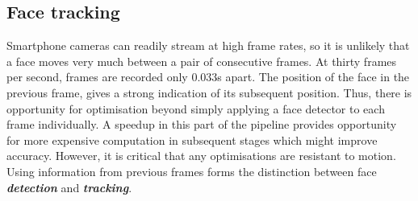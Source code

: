\subsection{Face tracking}
\label{section:face_tracking_impl}
Smartphone cameras can readily stream at high frame rates, so it is unlikely that a face moves very much between a pair of consecutive frames. At thirty frames per second, frames are recorded only 0.033s apart. The position of the face in the previous frame, gives a strong indication of its subsequent position. Thus, there is opportunity for optimisation beyond simply applying a face detector to each frame individually. 
A speedup in this part of the pipeline provides opportunity for more expensive computation in subsequent stages which might improve accuracy. However, it is critical that any optimisations are resistant to motion. Using information from previous frames forms the distinction between face \textbf{\textit{detection}} and \textbf{\textit{tracking}}.

